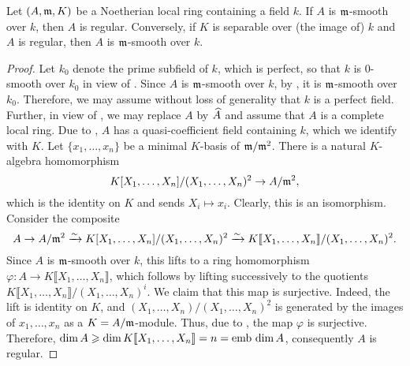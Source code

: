 \begin{lemma}
    Let $(A,\mathfrak{m}, K)$ be a Noetherian local ring containing a field $k$. If $A$ is $\mathfrak{m}$-smooth over $k$, then $A$ is regular. 
    Conversely, if $K$ is separable over (the image of) $k$ and $A$ is regular, then $A$ is $\mathfrak{m}$-smooth over $k$.
\end{lemma}
\begin{proof}
    Let $k_0$ denote the prime subfield of $k$, which is perfect, so that $k$ is $0$-smooth over $k_0$ in view of . Since $A$ is $\mathfrak{m}$-smooth over $k$, by , it is $\mathfrak{m}$-smooth over $k_0$. Therefore, we may assume without loss of generality that $k$ is a perfect field. Further, in view of , we may replace $A$ by $\widehat{A}$ and assume that $A$ is a complete local ring. Due to , $A$ has a quasi-coefficient field containing $k$, which we identify with $K$. Let $\{x_1,\dots,x_n\}$ be a minimal $K$-basis of $\mathfrak{m}/\mathfrak{m}^2$. There is a natural $K$-algebra homomorphism 
    \begin{equation*}
        K[X_1,\dots,X_n]/(X_1,\dots,X_n)^2\to A/\mathfrak{m}^2,
    \end{equation*}
    which is the identity on $K$ and sends $X_i\mapsto x_i$. Clearly, this is an isomorphism. Consider the composite 
    \begin{equation*}
        A\to A/\mathfrak{m}^2\xrightarrow{\sim} K[X_1,\dots,X_n]/(X_1,\dots,X_n)^2\xrightarrow{\sim} K\llbracket X_1,\dots, X_n\rrbracket/(X_1,\dots,X_n)^2.
    \end{equation*}
    Since $A$ is $\mathfrak{m}$-smooth over $k$, this lifts to a ring homomorphism $\varphi\colon A\to K\llbracket X_1,\dots, X_n\rrbracket$, which follows by lifting successively to the quotients $K\llbracket X_1,\dots,X_n\rrbracket/(X_1,\dots,X_n)^i$. We claim that this map is surjective. Indeed, the lift is identity on $K$, and $(X_1,\dots,X_n)/(X_1,\dots,X_n)^2$ is generated by the images of $x_1,\dots, x_n$ as a $K = A/\mathfrak{m}$-module. Thus, due to , the map $\varphi$ is surjective.
    Therefore, $\dim A\geqslant\dim K\llbracket X_1,\dots, X_n\rrbracket = n = \operatorname{emb~dim} A$, consequently $A$ is regular.


\end{proof}
